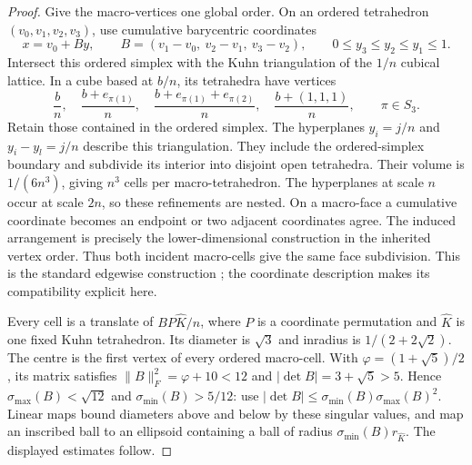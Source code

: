 \begin{proof}
Give the macro-vertices one global order. On an ordered tetrahedron
\((v_0,v_1,v_2,v_3)\), use cumulative barycentric coordinates
\[
 x=v_0+B y,\qquad
 B=(v_1-v_0,\ v_2-v_1,\ v_3-v_2),\qquad
 0\leq y_3\leq y_2\leq y_1\leq1.
\]
Intersect this ordered simplex with the Kuhn triangulation of the
\(1/n\) cubical lattice. In a cube based at \(b/n\), its tetrahedra
have vertices
\[
 \frac bn,\quad\frac{b+e_{\pi(1)}}n,\quad
 \frac{b+e_{\pi(1)}+e_{\pi(2)}}n,\quad
 \frac{b+(1,1,1)}n,
 \qquad \pi\in S_3.
\]
Retain those contained in the ordered simplex. The hyperplanes
\(y_i=j/n\) and \(y_i-y_l=j/n\) describe this triangulation.
They include the ordered-simplex boundary and subdivide its interior into
disjoint open tetrahedra. Their volume is \(1/(6n^3)\), giving
\(n^3\) cells per macro-tetrahedron. The hyperplanes at scale \(n\)
occur at scale \(2n\), so these refinements are nested.
On a macro-face a cumulative coordinate becomes an endpoint or two
adjacent coordinates agree. The induced arrangement is precisely the
lower-dimensional construction in the inherited vertex order. Thus both
incident macro-cells give the same face subdivision. This is the standard
edgewise construction \cite{EdelsbrunnerGrayson2000}; the coordinate
description makes its compatibility explicit here.

Every cell is a translate of \(BP\widehat K/n\), where \(P\)
is a coordinate permutation and \(\widehat K\) is one fixed Kuhn
tetrahedron. Its diameter is \(\sqrt3\) and inradius is
\(1/(2+2\sqrt2)\). The centre is the first vertex of every ordered
macro-cell. With \(\varphi=(1+\sqrt5)/2\), its matrix satisfies
\(\|B\|_F^2=\varphi+10<12\) and
\(|\det B|=3+\sqrt5>5\). Hence
\(\sigma_{\max}(B)<\sqrt{12}\) and
\(\sigma_{\min}(B)>5/12\): use
\(|\det B|\leq\sigma_{\min}(B)\sigma_{\max}(B)^2\).
Linear maps bound diameters above and below by these singular values,
and map an inscribed ball to an ellipsoid containing a ball of radius
\(\sigma_{\min}(B)r_{\widehat K}\). The displayed estimates follow.
\end{proof}

